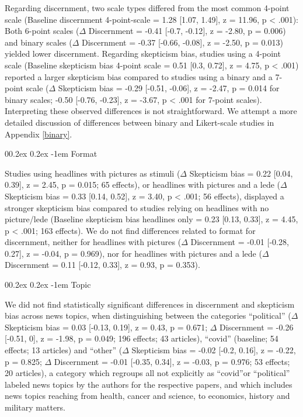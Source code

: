 \documentclass[
  doc,floatsintext]{apa6}
\makeatletter
\let\oldparagraph\paragraph
\renewcommand{\paragraph}{
    \@ifstar
      \xxxParagraphStar
      \xxxParagraphNoStar
  }
\newcommand{\xxxParagraphStar}[1]{\oldparagraph*{#1}\mbox{}}
\newcommand{\xxxParagraphNoStar}[1]{\oldparagraph{#1}\mbox{}}
\renewcommand{\paragraph}{\@startsection{paragraph}{4}{\parindent}%
  {0\baselineskip \@plus 0.2ex \@minus 0.2ex}%
  {-1em}%
  {\normalfont\normalsize\bfseries\itshape\typesectitle}}
\makeatother
\begin{document}
Regarding discernment, two scale types differed from the most common 4-point scale (Baseline discernment 4-point-scale = 1.28 {[}1.07, 1.49{]}, z = 11.96, p \textless{} .001): Both 6-point scales (\(\Delta\) Discernment = -0.41 {[}-0.7, -0.12{]}, z = -2.80, p = 0.006) and binary scales (\(\Delta\) Discernment = -0.37 {[}-0.66, -0.08{]}, z = -2.50, p = 0.013) yielded lower discernment. Regarding skepticism bias, studies using a 4-point scale (Baseline skepticism bias 4-point scale = 0.51 {[}0.3, 0.72{]}, z = 4.75, p \textless{} .001) reported a larger skepticism bias compared to studies using a binary and a 7-point scale (\(\Delta\) Skepticism bias = -0.29 {[}-0.51, -0.06{]}, z = -2.47, p = 0.014 for binary scales; -0.50 {[}-0.76, -0.23{]}, z = -3.67, p \textless{} .001 for 7-point scales). Interpreting these observed differences is not straightforward. We attempt a more detailed discussion of differences between binary and Likert-scale studies in Appendix \ref{binary}.

\paragraph{Format}\label{format}

Studies using headlines with pictures as stimuli (\(\Delta\) Skepticism bias = 0.22 {[}0.04, 0.39{]}, z = 2.45, p = 0.015; 65 effects), or headlines with pictures and a lede (\(\Delta\) Skepticism bias = 0.33 {[}0.14, 0.52{]}, z = 3.40, p \textless{} .001; 56 effects), displayed a stronger skepticism bias compared to studies relying on headlines with no picture/lede (Baseline skepticism bias headlines only = 0.23 {[}0.13, 0.33{]}, z = 4.45, p \textless{} .001; 163 effects). We do not find differences related to format for discernment, neither for headlines with pictures (\(\Delta\) Discernment = -0.01 {[}-0.28, 0.27{]}, z = -0.04, p = 0.969), nor for headlines with pictures and a lede (\(\Delta\) Discernment = 0.11 {[}-0.12, 0.33{]}, z = 0.93, p = 0.353).

\paragraph{Topic}\label{topic}

We did not find statistically significant differences in discernment and skepticism bias across news topics, when distinguishing between the categories ``political'' (\(\Delta\) Skepticism bias = 0.03 {[}-0.13, 0.19{]}, z = 0.43, p = 0.671; \(\Delta\) Discernment = -0.26 {[}-0.51, 0{]}, z = -1.98, p = 0.049; 196 effects; 43 articles), ``covid'' (baseline; 54 effects; 13 articles) and ``other'' (\(\Delta\) Skepticism bias = -0.02 {[}-0.2, 0.16{]}, z = -0.22, p = 0.825; \(\Delta\) Discernment = -0.01 {[}-0.35, 0.34{]}, z = -0.03, p = 0.976; 53 effects; 20 articles), a category which regroups all not explicitly as ``covid''or ``political'' labeled news topics by the authors for the respective papers, and which includes news topics reaching from health, cancer and science, to economics, history and military matters.
\end{document}
